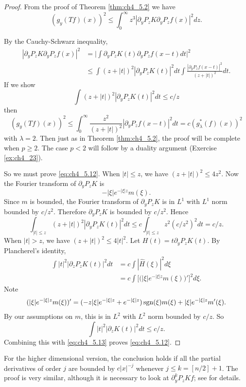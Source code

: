\begin{proof}
From the proof of Theorem \ref{thm:ch4_5.2} we have
\[
    (g_y(Tf)(x))^2 \leq \int_0^\infty z^3|\partial_yP_zK\partial_yP_zf(x)|^2dz.
\]

By the Cauchy-Schwarz inequality,
\begin{align*}
    |\partial_yP_zK\partial_yP_zf(x)|^2 &= \Big|\int \partial_yP_zK(t)\partial_yP_zf(x-t)dt\Big|^2 \\
    &\leq \int (z+|t|)^2|\partial_yP_zK(t)|^2dt \int \frac{|\partial_yP_zf(x-t)|^2}{(z+|t|)^2}dt.
\end{align*}
If we show
\begin{equation}\label{eq:ch4_5.12}
    \int (z+|t|)^2|\partial_yP_zK(t)|^2dt \leq c/z
\end{equation}
then
\[
    (g_y(Tf)(x))^2 \leq \int_0^\infty \frac{z^2}{(z+|t|)^2}|\partial_yP_zf(x-t)|^2dt = c(g_\lambda^*(f)(x))^2
\]
with $\lambda = 2$. Then just as in Theorem \ref{thm:ch4_5.2}, the proof will be complete when $p \geq 2$. The case $p < 2$ will follow by a duality argument (Exercise \ref{ex:ch4_23}).

So we must prove \eqref{eq:ch4_5.12}. When $|t| \leq z$, we have $(z+|t|)^2 \leq 4z^2$. Now the Fourier transform of $\partial_yP_zK$ is
\[
    -|\xi|e^{-|\xi|z}m(\xi).
\]
Since $m$ is bounded, the Fourier transform of $\partial_yP_zK$ is in $L^1$ with $L^1$ norm bounded by $c/z^2$. Therefore $\partial_yP_zK$ is bounded by $c/z^2$. Hence
\begin{equation}\label{eq:ch4_5.13}
    \int_{|t|\leq z} (z+|t|)^2|\partial_yP_zK(t)|^2dt \leq c \int_{|t|\leq z} z^2(c/z^2)^2dt = c/z.
\end{equation}
When $|t| > z$, we have $(z+|t|)^2 \leq 4|t|^2$. Let $H(t) = t\partial_yP_zK(t)$. By Plancherel's identity,
\begin{align*}
    \int |t|^2|\partial_zP_zK(t)|^2dt &= c \int |\widehat{H}(\xi)|^2d\xi \\
    &= c \int \Big[\Big(|\xi|e^{-|\xi|z}m(\xi)\Big)'\Big]^2d\xi.
\end{align*}
Note
\[
    (|\xi|e^{-|\xi|z}m(\xi))' = (-z|\xi| e^{-|\xi|z} + e^{-|\xi|z})\operatorname{sgn}(\xi)m(\xi) + |\xi|e^{-|\xi|z}m'(\xi).
\]
\mnewpage
By our assumptions on $m$, this is in $L^2$ with $L^2$ norm bounded by $c/z$. So
\[
    \int |t|^2|\partial_zK(t)|^2dt \leq c/z.
\]
Combining this with \eqref{eq:ch4_5.13} proves \eqref{eq:ch4_5.12}.
\end{proof}

For the higher dimensional version, the conclusion holds if all the partial derivatives of order $j$ are bounded by $c|x|^{-j}$ whenever $j \leq k = [n/2]+1$. The proof is very similar, although it is necessary to look at $\partial_y^kP_zKf$; see \cite{Stein1970a} for details.

